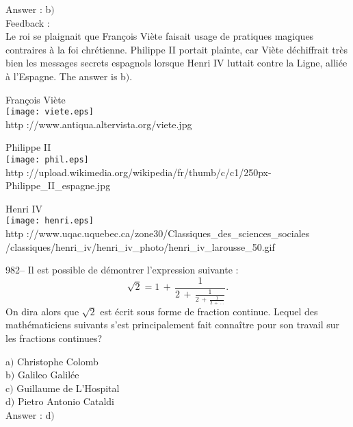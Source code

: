 \documentclass[letterpaper, 12pt]{article}
\begin{document}
Answer : b$)$\\

Feedback : \\
Le roi se plaignait que Fran\c cois Vi\`ete faisait usage de
pratiques magiques contraires \`a la foi chr\'etienne. Philippe II
portait plainte, car Vi\`ete d\'echiffrait tr\`es bien les messages
secrets espagnols lorsque Henri IV luttait contre la Ligne, alli\'ee
\`a l'Espagne.
The answer is b$)$.\\

        \begin{center}
        Fran\c cois Vi\`ete\\
    \texttt{[image: viete.eps]}\\
        {\footnotesize http ://www.antiqua.altervista.org/viete.jpg}
    \end{center}

        \begin{center}
        Philippe II\\
    \texttt{[image: phil.eps]}\\
        {\footnotesize http
://upload.wikimedia.org/wikipedia/fr/thumb/c/c1/250px-Philippe\_II\_espagne.jpg}
    \end{center}

        \begin{center}
        Henri IV\\
    \texttt{[image: henri.eps]}\\
        {\footnotesize http
://www.uqac.uquebec.ca/zone30/Classiques\_des\_sciences\_sociales\\
        /classiques/henri\_iv/henri\_iv\_photo/henri\_iv\_larousse\_50.gif}
    \end{center}

982-- Il est possible de d\'emontrer l'expression suivante :
$$\sqrt2=1\,+\,\frac1{2\,+\,\frac1{2\,+\,\frac1{2\,+\,\ldots}}}.$$
On dira alors que $\sqrt2$ est \'ecrit sous forme de fraction
continue. Lequel des math\'ematiciens suivants s'est principalement
fait conna\^itre pour son travail sur les fractions continues?

a$)$ Christophe Colomb \\
b$)$ Galileo Galil\'ee \\
c$)$ Guillaume de L'Hospital \\
d$)$ Pietro Antonio Cataldi\\

Answer : d$)$\\
\end{document}
